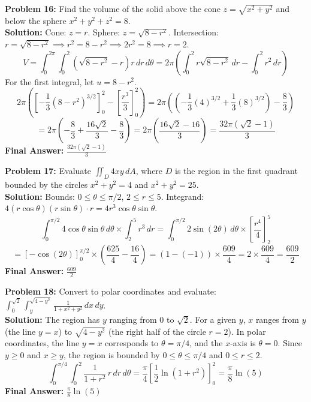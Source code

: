 \documentclass[11pt]{article}
\begin{document}
\vspace{0.5cm}
\textbf{Problem 16:} Find the volume of the solid above the cone $z = \sqrt{x^2+y^2}$ and below the sphere $x^2+y^2+z^2=8$.
\\
\textbf{Solution:}
Cone: $z=r$. Sphere: $z = \sqrt{8-r^2}$.
Intersection: $r = \sqrt{8-r^2} \implies r^2 = 8-r^2 \implies 2r^2=8 \implies r=2$.
$$ V = \int_0^{2\pi} \int_0^2 \left( \sqrt{8-r^2} - r \right) r \, dr \, d\theta = 2\pi \left( \int_0^2 r\sqrt{8-r^2} \, dr - \int_0^2 r^2 \, dr \right) $$
For the first integral, let $u=8-r^2$.
$$ 2\pi \left( \left[ -\frac{1}{3}(8-r^2)^{3/2} \right]_0^2 - \left[ \frac{r^3}{3} \right]_0^2 \right) = 2\pi \left( \left(-\frac{1}{3}(4)^{3/2} + \frac{1}{3}(8)^{3/2} \right) - \frac{8}{3} \right) $$
$$ = 2\pi \left( -\frac{8}{3} + \frac{16\sqrt{2}}{3} - \frac{8}{3} \right) = 2\pi \left( \frac{16\sqrt{2} - 16}{3} \right) = \frac{32\pi(\sqrt{2}-1)}{3} $$
\textbf{Final Answer:} $\frac{32\pi(\sqrt{2}-1)}{3}$

\vspace{0.5cm}
\textbf{Problem 17:} Evaluate $\iint_D 4xy \, dA$, where $D$ is the region in the first quadrant bounded by the circles $x^2+y^2=4$ and $x^2+y^2=25$.
\\
\textbf{Solution:}
Bounds: $0 \le \theta \le \pi/2$, $2 \le r \le 5$. Integrand: $4(r\cos\theta)(r\sin\theta) \cdot r = 4r^3\cos\theta\sin\theta$.
$$ \int_0^{\pi/2} 4\cos\theta\sin\theta \, d\theta \times \int_2^5 r^3 \, dr = \int_0^{\pi/2} 2\sin(2\theta) \, d\theta \times \left[ \frac{r^4}{4} \right]_2^5 $$
$$ = \left[ -\cos(2\theta) \right]_0^{\pi/2} \times \left( \frac{625}{4} - \frac{16}{4} \right) = (1 - (-1)) \times \frac{609}{4} = 2 \times \frac{609}{4} = \frac{609}{2} $$
\textbf{Final Answer:} $\frac{609}{2}$

\vspace{0.5cm}
\textbf{Problem 18:} Convert to polar coordinates and evaluate: $\int_0^{\sqrt{2}} \int_y^{\sqrt{4-y^2}} \frac{1}{1+x^2+y^2} \, dx \, dy$.
\\
\textbf{Solution:}
The region has $y$ ranging from $0$ to $\sqrt{2}$. For a given $y$, $x$ ranges from $y$ (the line $y=x$) to $\sqrt{4-y^2}$ (the right half of the circle $r=2$).
In polar coordinates, the line $y=x$ corresponds to $\theta = \pi/4$, and the $x$-axis is $\theta = 0$. Since $y \ge 0$ and $x \ge y$, the region is bounded by $0 \le \theta \le \pi/4$ and $0 \le r \le 2$.
$$ \int_0^{\pi/4} \int_0^2 \frac{1}{1+r^2} \, r \, dr \, d\theta = \frac{\pi}{4} \left[ \frac{1}{2} \ln(1+r^2) \right]_0^2 = \frac{\pi}{8} \ln(5) $$
\textbf{Final Answer:} $\frac{\pi}{8} \ln(5)$
\end{document}
